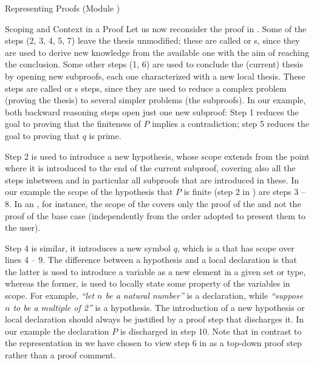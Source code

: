 \begin{tchapter}[id=proofs,short=Representing Proofs]{Representing Proofs (Module {})}
\begin{tsection}[id=proofs:scoping]{Scoping and Context in a Proof}
  Let us now reconsider the proof in {}. Some of the steps (2,
  3, 4, 5, 7) leave the thesis unmodified; these are called {}
  or {s}, since they are used to derive new knowledge
  from the available one with the aim of reaching the conclusion.  Some other steps (1, 6)
  are used to conclude the (current) thesis by opening new subproofs, each one
  characterized with a new local thesis.  These steps are called
  {} or {s} steps, since they
  are used to reduce a complex problem (proving the thesis) to several simpler problems
  (the subproofs).  In our example, both backward reasoning steps open just one new
  subproof: Step 1 reduces the goal to proving that the finiteness of $P$ implies a
  contradiction; step 5 reduces the goal to proving that $q$ is prime.
  
  Step 2 is used to introduce a new hypothesis, whose scope extends from the point where
  it is introduced to the end of the current subproof, covering also all the steps
  inbetween and in particular all subproofs that are introduced in these. In our example
  the scope of the hypothesis that $P$ is finite (step 2 in {})
  are steps 3 -- 8. In an {}, for instance, the scope of the
  {} covers only the proof of the
  {} and not the proof of the base case (independently from the
  order adopted to present them to the user).
  
  Step 4 is similar, it introduces a new symbol $q$, which is a
  {} that has scope over lines 4 -- 9.  The difference between
  a hypothesis and a local declaration is that the latter is used to introduce a variable
  as a new element in a given set or type, whereas the former, is used to locally state
  some property of the variables in scope. For example, {\emph{``let $n$ be a natural
      number''}} is a declaration, while {\emph{``suppose $n$ to be a multiple of 2''}} is
  a hypothesis.  The introduction of a new hypothesis or local declaration should always
  be justified by a proof step that discharges it. In our example the declaration $P$ is
  discharged in step 10. Note that in contrast to the representation in
  {} we have chosen to view step 6 in
  {} as a top-down proof step rather than a proof comment.
  

\end{tsection}
\end{tchapter}
